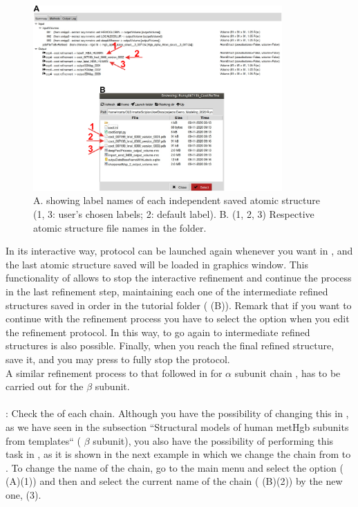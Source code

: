  \begin{figure}[H]
  \centering 
  \captionsetup{width=.9\linewidth} 
  \includegraphics[width=0.85\textwidth]{Images/Fig26}
  \caption{A. \coot {} showing label names of each independent saved atomic structure (1, 3: user's chosen labels; 2: default label). B. (1, 2, 3) Respective atomic structure file names in the  folder.}
  \label{fig:coot_summary}
  \end{figure}
 
 In its interactive way,  protocol can be launched again whenever you want in \scipion, and the last atomic structure saved will be loaded in \coot graphics window. This functionality of \scipion allows to stop the interactive refinement and continue the process in the last refinement step, maintaining each one of the intermediate refined structures saved in order in the \scipion tutorial folder  ( (B)). Remark that if you want to continue with the refinement process you have to select the  option  when you edit the \coot refinement protocol. In this way, to go again to intermediate refined structures is also possible. Finally, when you reach the final refined structure, save it, and you may press  to fully stop the \coot protocol.\\
 
 A similar refinement process to that followed in \coot for  $\alpha$ subunit chain , has to be carried out for the  $\beta$ subunit.\\
 \\
 : Check the  of each chain. Although you have the possibility of changing this  in \chimera, as we have seen in the subsection ``Structural models of human metHgb subunits from templates`` ( $\beta$ subunit), you also have the possibility of performing this task in \coot, as it is shown in the next example in which we change the chain  from  to . To change the name of the chain, go to the \coot main menu and select the option  ( (A)(1)) and then  and select the current name of the chain  ( (B)(2)) by the new one,  (3).
 
